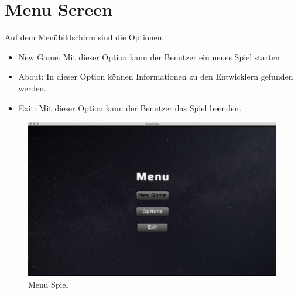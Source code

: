 \documentclass[12pt]{article}
\begin{document}
\section{Menu Screen}
Auf dem Menübildschirm sind die Optionen:
\begin{itemize}
\item New Game: Mit dieser Option kann der Benutzer ein neues Spiel starten
\item About: In dieser Option können Informationen zu den Entwicklern gefunden werden.
\item Exit: Mit dieser Option kann der Benutzer das Spiel beenden.
\end{itemize}
\begin{figure}[htp]
\centering
\includegraphics[scale=0.3]{TestProtocolBilder/menuScreen.png}
\caption{Menu Spiel}
\end{figure}
\newpage
\end{document}
